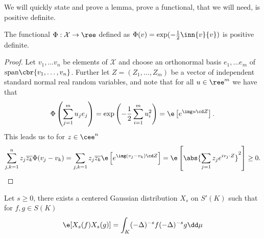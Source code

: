 We will quickly state and prove a lemma, prove a functional, that we will need, is positive definite.
\begin{lemma}\label{LambdaPosDefinite}
	The functional $\Phi: \mathcal{X} \to \ree$ defined as  $\Phi(v) = \exp(-\frac{1}{2} \inn{v}{v})$ is positive definite.
\end{lemma}
\begin{proof}
	Let $v_1, \ldots v_n$ be elements of $\mathcal{X}$ and choose an orthonormal basis $e_1, \ldots e_m$ of $\text{span}\cbr{v_1, \ldots, v_n}$. Further let $Z = (Z_1, \ldots, Z_m)$ be a vector of independent standard normal real random variables, and note that for all $u \in \ree^{m}$ we have that
	\begin{equation}
		\Phi \left(\sum_{j = 1}^{m} u_j e_j\right) = \exp \left(-\frac{1}{2} \sum_{i = 1}^{m} u_i^2\right) = \e \left[e^{ \img u \cd Z}\right].
	\end{equation}
	This leads us to for $z \in \cee^{n}$ 
	\begin{equation}
		\sum_{j, k = 1}^{n}z_j \overline{z_k} \Phi(v_j - v_k) = \sum_{j,  k = 1} z_j \overline{z_k} \e \left[e^{\img (v_j -v_k) \cd Z}\right] = \e \left[\abs{\sum_{j = 1} z_j e^{i v_j \cdot Z}}^2\right] \geq 0.
	\end{equation}
\end{proof}

\begin{theorem}
	Let $s \geq 0$, there exists a centered Gaussian distribution $X_s$ on $S'(K)$ such that for $f,g \in S(K)$
	\begin{equation}
		\e[X_s(f)X_s(g)] = \int_{K} (-\Delta)^{-s}f (-\Delta)^{-s}g \dd \mu
	\end{equation}
\end{theorem}


